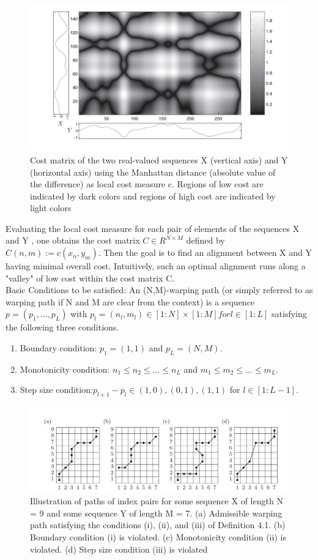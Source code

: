 \documentclass[12pt,a4paper]{report}
\begin{document}
\begin{figure}[h!]
	\centering
		\includegraphics[scale=0.6]{screenshots/dtw/cost_matrix.png}
		\caption{Cost matrix of the two real-valued sequences X (vertical axis) and Y
(horizontal axis) using the Manhattan distance (absolute value of the difference) as
local cost measure c. Regions of low cost are indicated by dark colors and regions
of high cost are indicated by light colors}
\end{figure}
Evaluating the local cost measure for each pair of elements of the sequences X and Y , one obtains the cost matrix
$C  \in R^{N  \times M}$ defined by $C(n,m) := c(x_n, y_m)$. Then the goal is to
find an alignment between X and Y having minimal overall cost. Intuitively,
such an optimal alignment runs along a "valley" of low cost within the cost
matrix C.
\\
Basic Conditions to be satisfied:
An (N,M)-warping path (or simply referred to as warping
path if N and M are clear from the context) is a sequence $p = (p_1, . . . , p_L)$
with $p_l = (n_l,m_l) \in [1 : N] \times [1 : M] for l \in [1 : L]$ satisfying the following
three conditions.
\begin{enumerate}
\item{Boundary condition: $p_1 = (1, 1)$ and $p_L = (N,M).$}
\item{Monotonicity condition: $n_1 \leq n_2 \leq . . .  \leq n_L$ and $m_1 \leq m_2 \leq . . . \leq m_L.$}
\item{Step size condition:$ p_{l+1} − p_l \in {(1, 0), (0, 1), (1, 1)} $ for $l \in [1 : L − 1].$}
\end{enumerate}
\begin{figure}[h!]
	\centering
		\includegraphics[scale=0.6]{screenshots/dtw/conditions.png}
		\caption{Illustration of paths of index pairs for some sequence X of length N = 9
and some sequence Y of length M = 7. (a) Admissible warping path satisfying the
conditions (i), (ii), and (iii) of Definition 4.1. (b) Boundary condition (i) is violated.
(c) Monotonicity condition (ii) is violated. (d) Step size condition (iii) is violated}
\end{figure}
\end{document}
